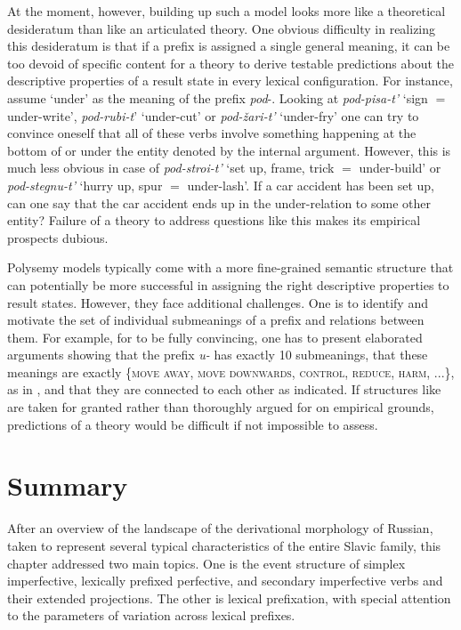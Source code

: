 \documentclass[output=paper,colorlinks,citecolor=brown]{langscibook}
\begin{document}
At the moment, however, building up such a model looks more like a theoretical desideratum than like an articulated theory. One obvious difficulty in realizing this desideratum is that if a prefix is assigned a single general meaning, it can be too devoid of specific content for a theory to derive testable predictions about the descriptive properties of a result state in every lexical configuration. For instance, assume ‘under’ as the meaning of the prefix \textit{pod}-. Looking at \textit{pod-pisa-t’} ‘sign $=$ under-write’, \textit{pod-rubi-t}’ ‘under-cut’ or \textit{pod-žari-t’} ‘under-fry’ one can try to convince oneself that all of these verbs involve something happening at the bottom of  or under the entity denoted by the internal argument. However, this is much less obvious in case of \textit{pod-stroi-t’} ‘set up, frame, trick $=$ under-build’ or \textit{pod-stegnu-t’} ‘hurry up, spur $=$ under-lash’. If a car accident has been set up, can one say that the car accident ends up in the under-relation to some other entity? Failure of a theory to address questions like this makes its empirical prospects dubious. 

Polysemy models typically come with a more fine-grained semantic structure that can potentially be more successful in assigning the right descriptive properties to result states. However, they face additional challenges. One is to identify and motivate the set of individual submeanings of a prefix and relations between them. For example, for  to be fully convincing, one has to present elaborated arguments showing that the prefix \textit{u-} has exactly 10 submeanings, that these meanings are exactly \{\textsc{move} \textsc{away,} \textsc{move} \textsc{downwards,} \textsc{control,} \textsc{reduce,} \textsc{harm,} ...\}, as in , and that they are connected to each other as indicated. If structures like  are taken for granted rather than thoroughly argued for on empirical grounds, predictions of a theory would be difficult if not impossible to assess. 

\section{Summary}\label{tat:sec:4} %
\hypertarget{RefHeadingToc164647634}{}
After an overview of the landscape of the derivational morphology of Russian, taken to represent several typical characteristics of the entire Slavic family, this chapter addressed two main topics. One is the event structure of simplex imperfective, lexically prefixed perfective, and secondary imperfective verbs and their extended projections. The other is lexical prefixation, with special attention to the parameters of variation across lexical prefixes.
\end{document}
